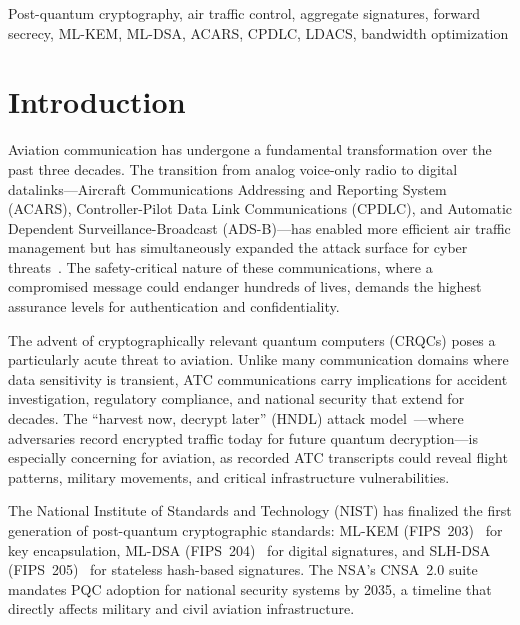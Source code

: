 \documentclass[conference,10pt]{IEEEtran}
\begin{document}
\begin{IEEEkeywords}
Post-quantum cryptography, air traffic control, aggregate signatures, forward secrecy, ML-KEM, ML-DSA, ACARS, CPDLC, LDACS, bandwidth optimization
\end{IEEEkeywords}

\section{Introduction}

Aviation communication has undergone a fundamental transformation over the past three decades. The transition from analog voice-only radio to digital datalinks---Aircraft Communications Addressing and Reporting System (ACARS), Controller-Pilot Data Link Communications (CPDLC), and Automatic Dependent Surveillance-Broadcast (ADS-B)---has enabled more efficient air traffic management but has simultaneously expanded the attack surface for cyber threats~\cite{strohmeier2015security, costin2012ghost}. The safety-critical nature of these communications, where a compromised message could endanger hundreds of lives, demands the highest assurance levels for authentication and confidentiality.

The advent of cryptographically relevant quantum computers (CRQCs) poses a particularly acute threat to aviation. Unlike many communication domains where data sensitivity is transient, ATC communications carry implications for accident investigation, regulatory compliance, and national security that extend for decades. The ``harvest now, decrypt later'' (HNDL) attack model~\cite{mosca2018cybersecurity}---where adversaries record encrypted traffic today for future quantum decryption---is especially concerning for aviation, as recorded ATC transcripts could reveal flight patterns, military movements, and critical infrastructure vulnerabilities.

The National Institute of Standards and Technology (NIST) has finalized the first generation of post-quantum cryptographic standards: ML-KEM (FIPS~203)~\cite{fips203} for key encapsulation, ML-DSA (FIPS~204)~\cite{fips204} for digital signatures, and SLH-DSA (FIPS~205)~\cite{fips205} for stateless hash-based signatures. The NSA's CNSA~2.0 suite~\cite{nsa2022cnsa2} mandates PQC adoption for national security systems by 2035, a timeline that directly affects military and civil aviation infrastructure.
\end{document}
